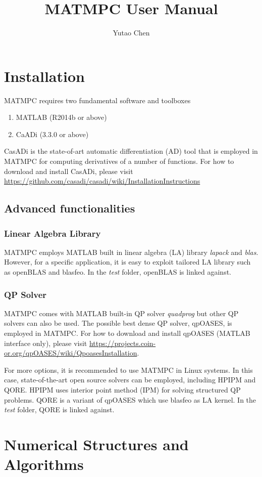 \documentclass{article}
\begin{document}
	\title{MATMPC User Manual}
	\author{Yutao Chen}
	
	\maketitle
	
\section{Installation}
MATMPC requires two fundamental software and toolboxes
\begin{enumerate}
	\item MATLAB (R2014b or above) 
	\item CaADi (3.3.0 or above)
\end{enumerate}
CasADi is the state-of-art automatic differentiation (AD) tool that is employed in MATMPC for computing derivatives of a number of functions. For how to download and install CasADi, please visit \url{https://github.com/casadi/casadi/wiki/InstallationInstructions}

\subsection{Advanced functionalities}

\subsubsection{Linear Algebra Library}
MATMPC employs MATLAB built in linear algebra (LA) library \emph{lapack} and \emph{blas}. However, for a specific application, it is easy to exploit tailored LA library such as openBLAS and blasfeo. In the \emph{test} folder, openBLAS is linked against.

\subsubsection{QP Solver}
MATMPC comes with MATLAB built-in QP solver \emph{quadprog} but other QP solvers can also be used. The possible best dense QP solver, qpOASES, is employed in MATMPC. For how to download and install qpOASES (MATLAB interface only), please visit \url{https://projects.coin-or.org/qpOASES/wiki/QpoasesInstallation}.

For more options, it is recommended to use MATMPC in Linux systems. In this case, state-of-the-art open source solvers can be employed, including HPIPM and QORE. HPIPM uses interior point method (IPM) for solving structured QP problems. QORE is a variant of qpOASES which use blasfeo as LA kernel. In the \emph{test} folder, QORE is linked against.

\section{Numerical Structures and Algorithms}
\end{document}
